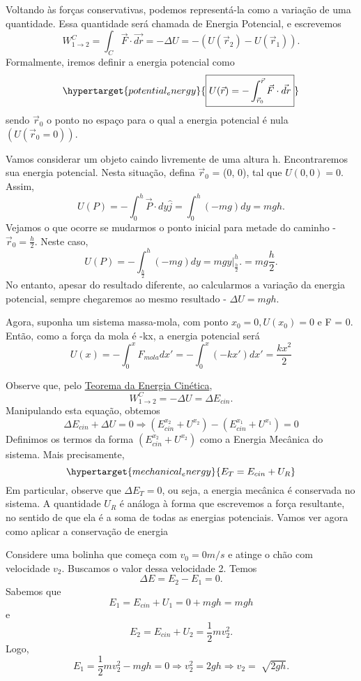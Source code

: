 \documentclass[physics_notes.tex]{subfiles}
\begin{document}
Voltando às forças conservativas, podemos representá-la como a variação de uma quantidade.
Essa quantidade será chamada de Energia Potencial, e escrevemos
\[
	W_{1\rightarrow2}^{C} = \int_{C}^{}\vec{F}\cdot \vec{dr} = -\Delta U = -(U(\vec{r}_{2}) - U(\vec{r}_{1})).
\]
Formalmente, iremos definir a energia potencial como
\[
	\hypertarget{potential_energy}{\boxed{U(\vec{r}) = -\int_{\vec{r}_{0}}^{\vec{r}}\vec{F}\cdot \vec{dr}}}
\]
sendo \(\vec{r}_{0}\) o ponto no espaço para o qual a energia potencial é nula \((U(\vec{r}_{0} = 0))\).
\begin{example}
	Vamos considerar um objeto caindo livremente de uma altura h. Encontraremos sua energia potencial.
	Nesta situação, defina \(\vec{r}_{0}\) = (0, 0), tal que \(U(0, 0) = 0.\) Assim,
	\[
		U(P) = -\int_{0}^{h}\vec{P}\cdot dy\hat{j} = \int_{0}^{h}(-mg)dy = mgh.
	\]
	Vejamos o que ocorre se mudarmos o ponto inicial para metade do caminho - \(\vec{r}_{0} = \frac{h}{2}\). Neste caso,
	\[
		U(P) = -\int_{\frac{h}{2}}^{h}(-mg)dy = mgy \biggl|_{\frac{h}{2}}^{h}\biggr. = mg \frac{h}{2}.
	\]
	No entanto, apesar do resultado diferente, ao calcularmos a variação da energia potencial,
	sempre chegaremos ao mesmo resultado - \(\Delta U = mgh.\)
\end{example}
\begin{example}
	Agora, suponha um sistema massa-mola, com ponto \(x_{0} = 0, U(x_{0}) = 0\)
	e F = 0. Então, como a força da mola é -kx, a energia potencial será
	\[
		U(x) = -\int_{0}^{x}F_{mola}dx'= - \int_{0}^{x}(-kx')dx' = \frac{kx^{2}}{2}
	\]
\end{example}

Observe que, pelo \hyperlink{work_kin_3d}{Teorema da Energia Cinética},
\[
	W_{1\rightarrow2}^{C} = -\Delta U = \Delta E_{cin}.
\]
Manipulando esta equação, obtemos
\[
	\Delta E_{cin} + \Delta U = 0 \Rightarrow (E_{cin}^{x_2} + U^{x_2}) - (E_{cin}^{x_1} + U^{x_1}) = 0
\]
Definimos os termos da forma \((E_{cin}^{x_2} + U^{x_2})\) como a Energia Mecânica do sistema. Mais precisamente,
\[
	\hypertarget{mechanical_energy}{E_{T} = E_{cin} + U_{R}}
\]
Em particular, observe que \(\Delta E_{T} = 0\), ou seja, a energia
mecânica é conservada no sistema. A quantidade \(U_{R}\) é análoga à
forma que escrevemos a força resultante, no sentido de que ela é a soma
de todas as energias potenciais. Vamos ver agora como aplicar a conservação de energia
\begin{example}
	Considere uma bolinha que começa com \(v_{0} = 0m/s\) e atinge o chão com velocidade
	\(v_{2}\). Buscamos o valor dessa velocidade 2. Temos
	\[
		\Delta E = E_{2} - E_{1} = 0.
	\]
	Sabemos que
	\[
		E_{1} = E_{cin} + U_{1} = 0 + mgh = mgh
	\]
	e
	\[
		E_{2} = E_{cin} + U_{2} = \frac{1}{2}mv_{2}^{2}.
	\]
	Logo,
	\[
		E_{1} = \frac{1}{2}mv_{2}^{2} - mgh = 0 \Rightarrow v_{2}^{2} = 2gh \Rightarrow v_{2} = \sqrt[]{2gh}.
	\]
\end{example}
\end{document}
